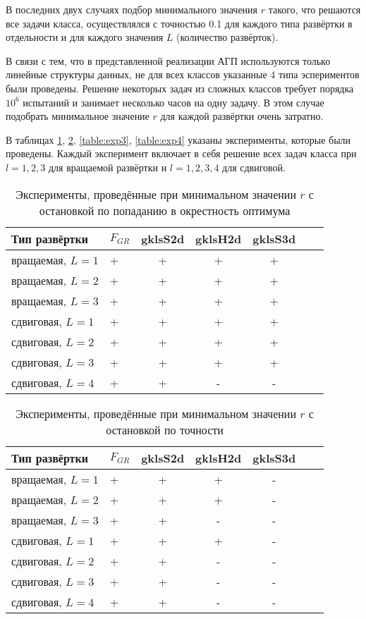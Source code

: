 \documentclass[a4paper]{article}
\begin{document}
В последних двух случаях подбор минимального значения $r$ такого, что решаются все задачи класса, осуществлялся с точностью 0.1 для каждого типа
развёртки в отдельности и для каждого значения $L$ (количество развёрток).

В связи с тем, что в представленной реализации АГП используются только линейные структуры данных, не для всех классов указанные 4 типа эспериментов были проведены. Решение некоторых задач из сложных классов требует порядка $10^6$ испытаний и занимает несколько часов на одну задачу. В этом случае подобрать минимальное значение $r$ для каждой развёртки очень затратно.

В таблицах \ref{table:exp1}, \ref{table:exp2}, \ref{table:exp3}, \ref{table:exp4} указаны эксперименты, которые были проведены. Каждый эксперимент включает в себя решение всех задач класса при $l=1,2,3$ для вращаемой развёртки и
$l=1,2,3,4$ для сдвиговой.

\begin{table}
\begin{center}
\caption{Эксперименты, проведённые при минимальном значении $r$ с остановкой по попаданию в окрестность оптимума}
  \begin{tabular}{l|l*{4}{c}r}
    \label{table:exp1}
  Тип развёртки & $F_{GR}$ & gklsS2d & gklsH2d & gklsS3d \\
  \hline
  вращаемая, $L=1$ & + & + & + & + \\
  вращаемая, $L=2$ & + & + & + & + \\
  вращаемая, $L=3$ & + & + & + & + \\
  сдвиговая, $L=1$ & + & + & + & + \\
  сдвиговая, $L=2$ & + & + & + & + \\
  сдвиговая, $L=3$ & + & + & + & + \\
  сдвиговая, $L=4$ & + & + & - & - \\
  \end{tabular}
\end{center}
\end{table}

\begin{table}
\begin{center}
\caption{Эксперименты, проведённые при минимальном значении $r$ с остановкой по точности}
  \begin{tabular}{l|l*{4}{c}r}
    \label{table:exp2}
  Тип развёртки & $F_{GR}$ & gklsS2d & gklsH2d & gklsS3d \\
  \hline
  вращаемая, $L=1$ & + & + & + & - \\
  вращаемая, $L=2$ & + & + & + & - \\
  вращаемая, $L=3$ & + & + & - & - \\
  сдвиговая, $L=1$ & + & + & + & - \\
  сдвиговая, $L=2$ & + & + & - & - \\
  сдвиговая, $L=3$ & + & + & - & - \\
  сдвиговая, $L=4$ & + & + & - & - \\
  \end{tabular}
\end{center}
\end{table}
\end{document}
